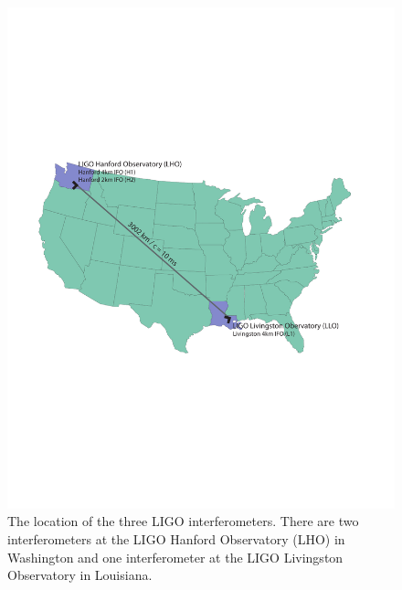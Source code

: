 \begin{figure}[p]
\begin{center}
\includegraphics[width=\linewidth]{figures/inspiral/observatories}
\end{center}
\caption[Location of LIGO Interferometers]{%
\label{f:usmap}
The location of the three LIGO interferometers. There are two interferometers
at the LIGO Hanford Observatory (LHO) in Washington and one interferometer at
the LIGO Livingston Observatory in Louisiana.
}
\end{figure}

